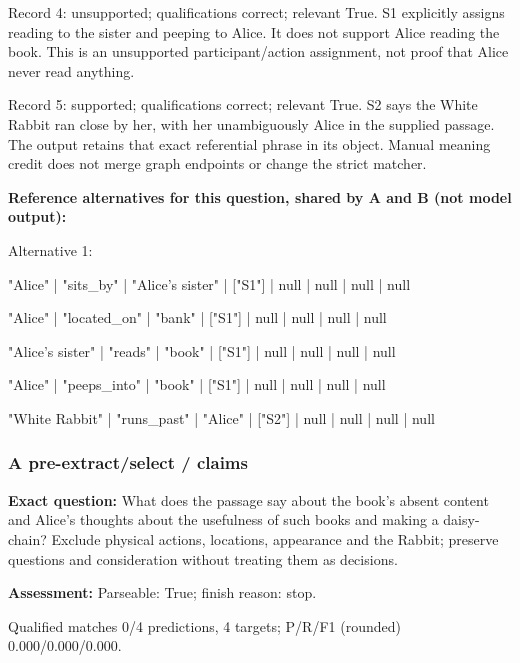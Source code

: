 \noindent Record 4: unsupported; qualifications correct; relevant True. S1 explicitly assigns reading to the sister and peeping to Alice. It does not support Alice reading the book. This is an unsupported participant/action assignment, not proof that Alice never read anything.\par\smallskip

\noindent Record 5: supported; qualifications correct; relevant True. S2 says the White Rabbit ran close by her, with her unambiguously Alice in the supplied passage. The output retains that exact referential phrase in its object. Manual meaning credit does not merge graph endpoints or change the strict matcher.\par\smallskip

\noindent\textbf{Reference alternatives for this question, shared by A and B (not model output):}

\noindent Alternative 1:

"Alice" | "sits\_by" | "Alice's sister" | ["S1"] | null | null | null | null\par\smallskip

"Alice" | "located\_on" | "bank" | ["S1"] | null | null | null | null\par\smallskip

"Alice's sister" | "reads" | "book" | ["S1"] | null | null | null | null\par\smallskip

"Alice" | "peeps\_into" | "book" | ["S1"] | null | null | null | null\par\smallskip

"White Rabbit" | "runs\_past" | "Alice" | ["S2"] | null | null | null | null\par\smallskip

\subsubsection*{A pre-extract/select / claims}

\noindent\textbf{Exact question:} What does the passage say about the book's absent content and Alice's thoughts about the usefulness of such books and making a daisy-chain? Exclude physical actions, locations, appearance and the Rabbit; preserve questions and consideration without treating them as decisions.\par

\noindent\textbf{Assessment:} Parseable: True; finish reason: stop.

Qualified matches 0/4 predictions, 4 targets; P/R/F1 (rounded) 0.000/0.000/0.000.\par

